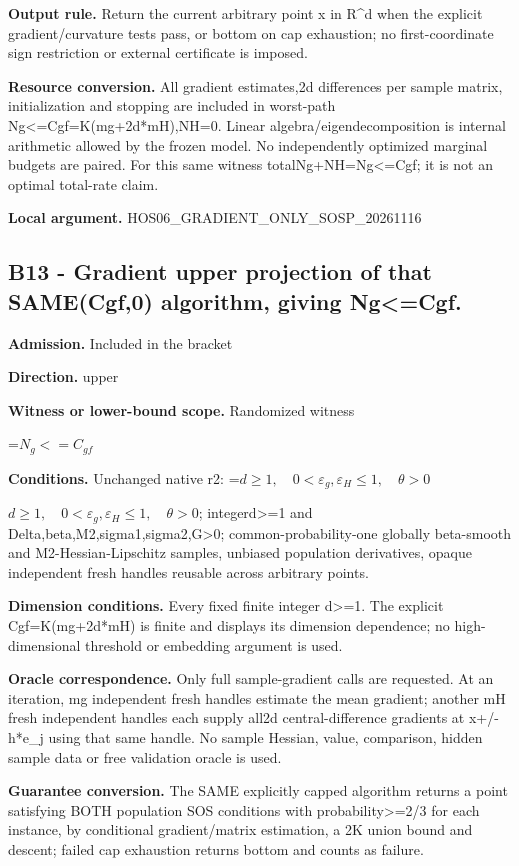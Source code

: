 \documentclass[10pt,a4paper]{article}
\newcommand{\AtlasMath}[1]{\par\begingroup\centering\setbox0=\hbox{$\displaystyle #1$}\ifdim\wd0>1.4\linewidth\typeout{ATLAS WIDE FORMULA: \the\wd0}\fi\ifdim\wd0>\linewidth\resizebox{\linewidth}{!}{\box0}\else\box0\fi\par\endgroup}
\newcommand{\AtlasInlineMath}[1]{\begingroup\setbox0=\hbox{$#1$}\ifdim\wd0>.4\linewidth\endgroup\AtlasMath{#1}\else\endgroup$#1$\fi}
\begin{document}
\textbf{Output rule.} Return the current arbitrary point x in R\textasciicircum{}d when the explicit gradient/curvature tests pass, or bottom on cap exhaustion; no first-coordinate sign restriction or external certificate is imposed.

\textbf{Resource conversion.} All gradient estimates,2d differences per sample matrix, initialization and stopping are included in worst-path Ng<=Cgf=K(mg+2d*mH),NH=0. Linear algebra/eigendecomposition is internal arithmetic allowed by the frozen model. No independently optimized marginal budgets are paired. For this same witness totalNg+NH=Ng<=Cgf; it is not an optimal total-rate claim.

\textbf{Local argument.} HOS06\_\allowbreak{}GRADIENT\_\allowbreak{}ONLY\_\allowbreak{}SOSP\_\allowbreak{}20261116

\subsection{B13 - Gradient upper projection of that SAME(Cgf,0) algorithm, giving Ng<=Cgf.}
\textbf{Admission.} Included in the bracket

\textbf{Direction.} upper

\textbf{Witness or lower-bound scope.} Randomized witness

\AtlasMath{N_g<=C_{gf}}
\textbf{Conditions.} Unchanged native r2: \AtlasInlineMath{d\ge1,\quad0<\varepsilon_g,\varepsilon_H\le1,\quad\theta>0}; integerd>=1 and Delta,beta,M2,sigma1,sigma2,G>0; common-probability-one globally beta-smooth and M2-Hessian-Lipschitz samples, unbiased population derivatives, opaque independent fresh handles reusable across arbitrary points.

\textbf{Dimension conditions.} Every fixed finite integer d>=1. The explicit Cgf=K(mg+2d*mH) is finite and displays its dimension dependence; no high-dimensional threshold or embedding argument is used.

\textbf{Oracle correspondence.} Only full sample-gradient calls are requested. At an iteration, mg independent fresh handles estimate the mean gradient; another mH fresh independent handles each supply all2d central-difference gradients at x+/-h*e\_\allowbreak{}j using that same handle. No sample Hessian, value, comparison, hidden sample data or free validation oracle is used.

\textbf{Guarantee conversion.} The SAME explicitly capped algorithm returns a point satisfying BOTH population SOS conditions with probability>=2/3 for each instance, by conditional gradient/matrix estimation, a 2K union bound and descent; failed cap exhaustion returns bottom and counts as failure.
\end{document}
